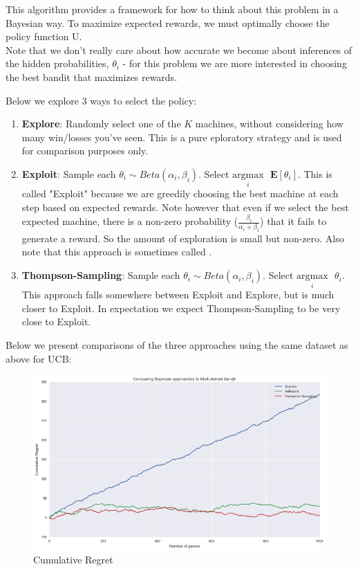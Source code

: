 \documentclass{article}
\begin{document}
This algorithm provides a framework for how to think about this problem in a Bayesian way. To maximize expected rewards, we must optimally choose the policy function U.\\

Note that we don't really care about how accurate we become about inferences of the hidden probabilities, $\theta_i$ - for this problem we are more interested in choosing the best bandit that maximizes rewards.

Below we explore 3 ways to select the policy:

\begin{enumerate}
\item \textbf{Explore}: Randomly select one of the $K$ machines, without considering how many win/losses you've seen. This is a pure eploratory strategy and is used for comparison purposes only.
\item \textbf{Exploit}: Sample each $\theta_i \sim Beta(\alpha_i, \beta_i)$. Select $\underset{i}{\text{argmax}}\text{ }\mathbf{E}[\theta_i]$. This is called {"Exploit"} because we are greedily choosing the best machine at each step based on expected rewards. Note however that even if we select the best expected machine, there is a non-zero probability ($\frac{\beta_i}{\alpha_i + \beta_i}$) that it fails to generate a reward. So the amount of exploration is small but non-zero. Also note that this approach is sometimes called .
\item \textbf{Thompson-Sampling}: Sample each $\theta_i \sim Beta(\alpha_i, \beta_i)$. Select $\underset{i}{\text{argmax}}\text{ }\theta_i$. This approach falls somewhere between Exploit and Explore, but is much closer to Exploit. In expectation we expect Thompson-Sampling to be very close to Exploit.
\end{enumerate}

Below we present comparisons of the three approaches using the same dataset as above for UCB:

\begin{figure}[H]
\centering
\includegraphics[scale=0.5]{Bayesian_regret.png}
\caption{Cumulative Regret}
\end{figure}
\end{document}

